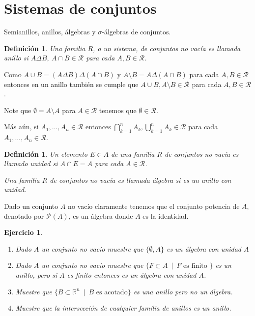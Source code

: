 \documentclass[twoside,12pt,a4 paper,openright]{book}
\newtheorem{ejer}[claim]{Ejercicio}
\newtheorem{defi}[claim]{Definici\'on}
\begin{document}
\section{Sistemas de conjuntos}
 Semianillos, anillos, \'algebras y $\sigma$-\'algebras de conjuntos.


\begin{defi}
Una familia $R$, o un sistema, de conjuntos no vac\'ia es llamada anillo si 
$A\Delta B,\ A\cap B \in \mathcal R$ para cada $A,B\in \mathcal R$.  
\end{defi}

\noindent
Como $A\cup B= (A\Delta B) \Delta (A\cap B) $ y $A\setminus B= A\Delta (A\cap  B)$ para cada $A,B \in \mathcal R$ entonces en un anillo tambi\'en se cumple que  $A\cup B, A\setminus B \in \mathcal R$ para cada $A,B\in \mathcal R$.

\noindent
Note que $\emptyset =A\setminus A$ para $A\in \mathcal R$ tenemos que $\emptyset \in \mathcal R$.

\noindent
M\'as a\'un, si $ A_1,\dots, A_n\in \mathcal R$ entonces $\displaystyle \bigcap_{k=1}^n A_k, \bigcup_{k=1}^n  A_k \in \mathcal R$ para cada $A_1,\dots, A_n \in \mathcal R$. 


\begin{defi} Un elemento $E\in A$ de una familia $R$  de conjuntos no vac\'ia es llamado  unidad   si 
$A \cap E  = A$ para cada $A\in \mathcal R$.

\noindent
 Una familia $R$  de conjuntos no vac\'ia es llamada \'algebra si  es un anillo con unidad.  
\end{defi}

\noindent
  Dado un conjunto $A $ no vac\'io claramente  tenemos que el conjunto potencia de $A$, denotado por  $\mathcal P(A)$, es un  \'algebra donde  $A$ es la identidad.


\begin{ejer} \ {} 
\begin{enumerate}
\item Dado $A$ un conjunto no vac\'io muestre  que  $\{\emptyset, A\}$ es un \'algebra con unidad $A$
\item Dado $A$ un conjunto  no vac\'io muestre que 
$   \{F\subset A \ \mid \ F \textrm{ es finito }\}$  es un anillo, pero si $A$ es finito entonces es un  \'algebra con unidad $A$.   
\item Muestre que $\{ B \subset \mathbb R^n  \ \mid \ B \textrm{ es acotado}\}$
 es una anillo pero no un \'algebra.
 
 \item Muestre que la intersecci\'on de cualquier familia de anillos es un anillo.

 \end{enumerate}



\end{ejer}
\end{document}
